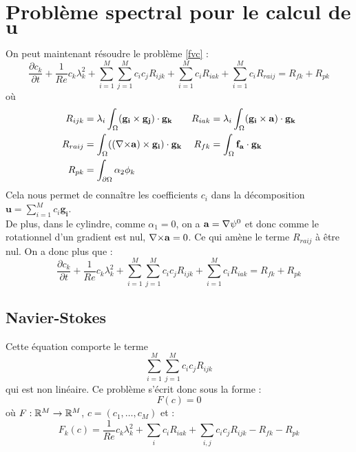 \chapter{Problème spectral pour le calcul de $\mathbf{u}$}
On peut maintenant résoudre le problème \ref{fvc} :
\[ \frac{\partial c_k}{\partial t} + \frac{1}{Re}c_k\lambda_k^2 + \sum_{i=1}^M\sum_{j=1}^Mc_ic_jR_{ijk} + \sum_{i=1}^Mc_iR_{iak} + \sum_{i=1}^Mc_iR_{raij} = R_{fk}+R_{pk} \]
où
\begin{align*}
R_{ijk} &= \lambda_i\int_\Omega(\mathbf{g_i}\times \mathbf{g_j})\cdot\mathbf{g_k} & R_{iak} &= \lambda_i\int_\Omega(\mathbf{g_i}\times \mathbf{a})\cdot\mathbf{g_k}\\
R_{raij} &= \int_\Omega(({\nabla\times}\mathbf{a})\times \mathbf{g_i})\cdot\mathbf{g_k} & R_{fk} &= \int_\Omega\mathbf{f_a}\cdot\mathbf{g_k}\\
R_{pk} &= \int_{\partial\Omega} \alpha_2\phi_k
\end{align*}
Cela nous permet de connaître les coefficients $c_i$ dans la décomposition $\mathbf{u}=\sum_{i=1}^M c_i\mathbf{g_i}$.\\


De plus, dans le cylindre, comme $\alpha_1=0$, on a $\mathbf{a}={\nabla}\psi^0$ et donc comme le rotationnel d'un gradient est nul, ${\nabla\times} \mathbf{a} = 0$. Ce qui amène le terme $R_{raij}$ à être nul. On a donc plus que :
\[ \frac{\partial c_k}{\partial t} + \frac{1}{Re}c_k\lambda_k^2 + \sum_{i=1}^M\sum_{j=1}^Mc_ic_jR_{ijk} + \sum_{i=1}^Mc_iR_{iak} = R_{fk}+R_{pk} \]

\section{Navier-Stokes}
\label{PSNewton}
Cette équation comporte le terme
\[ \sum_{i=1}^M\sum_{j=1}^M c_i c_jR_{ijk} \]
qui est non linéaire. Ce problème s'écrit donc sous la forme :
\[ F(c) = 0 \]
où $F:{\mathbb{R}}^M\rightarrow{\mathbb{R}}^M$, $c=(c_1,\ldots, c_M)$ et :
\begin{equation}\label{psf}
 F_k(c) = \frac{1}{Re} c_k\lambda_k^2 + \sum_i c_i R_{iak} + \sum_{i,j} c_i c_j R_{ijk} - R_{fk} - R_{pk}
\end{equation}

